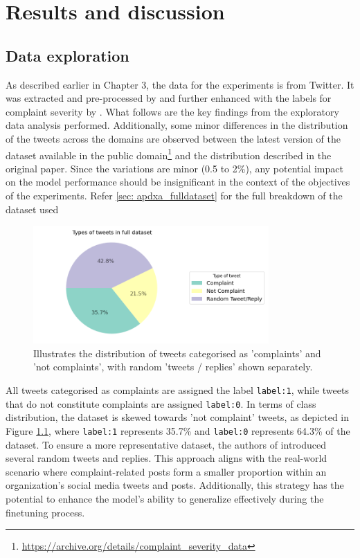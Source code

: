 \chapter{Results and discussion}

\section{Data exploration}
As described earlier in Chapter 3, the data for the experiments is from Twitter. It was extracted and pre-processed by \cite{preotiuc-pietro_automatically_2019} and further enhanced with the labels for complaint severity by \cite{jinModelingSeverityComplaints2021}. What follows are the key findings from the exploratory data analysis performed. Additionally, some minor differences in the distribution of the tweets across the domains are observed between the latest version of the dataset available in the public domain\footnote{\url{https://archive.org/details/complaint_severity_data}} and the distribution described in the original paper. Since the variations are minor (0.5 to 2\%), any potential impact on the model performance should be insignificant in the context of the objectives of the experiments. Refer \ref{sec: apdxa_fulldataset} for the full breakdown of the dataset used


\begin{figure}[htb]
    \centering
    \includegraphics[width=9cm]{figures/compl_non_random_dist.png}
    \vspace*{-3mm}
    \caption{Illustrates the distribution of tweets categorised as 'complaints' and 'not complaints', with random 'tweets / replies' shown separately.}
    \label{fig: compl_non_random_dist}
\end{figure}


All tweets categorised as complaints are assigned the label \texttt{label:1}, while tweets that do not constitute complaints are assigned \texttt{label:0}. In terms of class distribution, the dataset is skewed towards 'not complaint' tweets, as depicted in Figure \ref{fig: compl_non_random_dist}, where \texttt{label:1} represents 35.7\% and \texttt{label:0} represents 64.3\% of the dataset. To ensure a more representative dataset, the authors of \cite{preotiuc-pietro_automatically_2019} introduced several random tweets and replies. This approach aligns with the real-world scenario where complaint-related posts form a smaller proportion within an organization's social media tweets and posts. Additionally, this strategy has the potential to enhance the model's ability to generalize effectively during the finetuning process.\\

